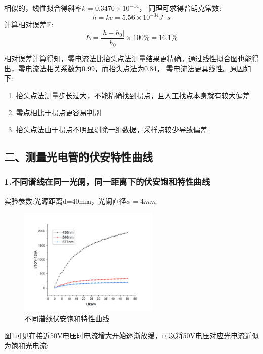 \documentclass[12pt,a4paper,UTF8]{ctexart}
\begin{document}
相似的，线性拟合得斜率$k=0.3470\times 10^{-14}$，
同理可求得普朗克常数:
\begin{equation*}
	h=ke=5.56\times10^{-34} J \cdot s
\end{equation*}
计算相对误差E:
\begin{equation*}
	E=\frac{\left\lvert h-h_0\right\rvert }{h_0}\times 100\%=16.1\%
\end{equation*}

相对误差计算得知，零电流法比抬头点法测量结果更精确。通过线性拟合图也能得出，零电流法相关系数为0.99，而抬头点法为0.84，
零电流法更具线性。原因如下:

\begin{enumerate}
	\item 抬头点法测量步长过大，不能精确找到拐点，且人工找点本身就有较大偏差
	\item 零点相比于拐点更容易判别
	\item 抬头点法由于拐点不明显剔除一组数据，采样点较少导致偏差
\end{enumerate}

\subsection*{二、测量光电管的伏安特性曲线}
\subsubsection*{1.不同谱线在同一光阑，同一距离下的伏安饱和特性曲线}
实验参数:光源距离d=40mm，光阑直径$\phi=4mm$.

\begin{figure}[!h]
	\centering
	\includegraphics[width=0.6\textwidth]{img//lambda.png}
	\caption{不同谱线伏安饱和特性曲线}
	\label{fig:lambda}
\end{figure}

图\ref{fig:lambda}可见在接近50V电压时电流增大开始逐渐放缓，可以将50V电压对应光电流近似为饱和光电流:
\end{document}
